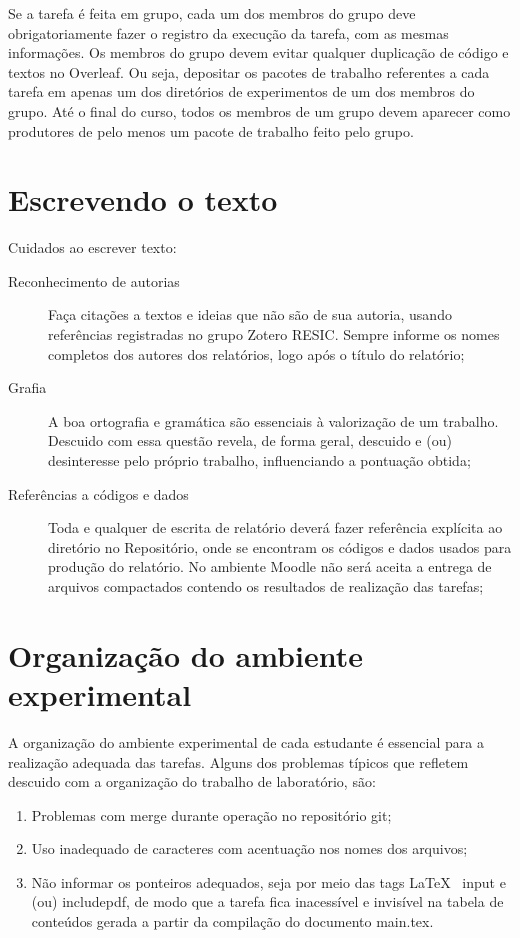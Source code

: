 Se a tarefa é feita em grupo, cada um dos membros do grupo deve obrigatoriamente fazer o registro da execução da tarefa, com as mesmas informações. Os membros do grupo devem evitar qualquer duplicação de código e textos no Overleaf. Ou seja, depositar os pacotes de trabalho referentes a cada tarefa em apenas um dos diretórios de experimentos de um dos membros do grupo. Até o final do curso, todos os membros de um grupo devem aparecer como produtores de pelo menos um pacote de trabalho feito pelo grupo.

\section{Escrevendo o texto}

Cuidados ao escrever texto:
\begin{description}
\item [Reconhecimento de autorias] Faça citações a textos e ideias que não são de sua autoria, usando referências registradas no grupo Zotero RESIC. Sempre informe os nomes completos dos autores dos relatórios, logo após o título do relatório;
\item [Grafia] A boa ortografia e gramática são essenciais à valorização de um trabalho. Descuido com essa questão revela, de forma geral, descuido e (ou) desinteresse pelo próprio trabalho, influenciando a pontuação obtida;
\item [Referências a códigos e dados] Toda e qualquer de escrita de relatório deverá fazer referência explícita ao diretório no Repositório, onde se encontram os códigos e dados usados para produção do relatório. No ambiente Moodle não será aceita a entrega de arquivos compactados contendo os resultados de realização das tarefas;
\end{description}

\section{Organização do ambiente experimental}

A organização do ambiente experimental de cada estudante é essencial para a realização adequada das tarefas.
Alguns dos problemas típicos que refletem descuido com a organização do trabalho de laboratório, são:

\begin{enumerate}
\item Problemas com merge durante operação no repositório git;
\item Uso inadequado de caracteres com acentuação nos nomes dos arquivos;
\item Não informar os ponteiros adequados, seja por meio das tags \LaTeX~ input e (ou) includepdf, de modo que a tarefa fica inacessível e invisível na tabela de conteúdos gerada a partir da compilação do documento main.tex.
\end{enumerate}


